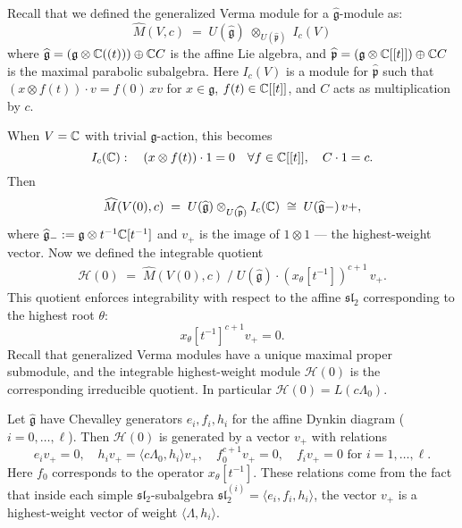 \documentclass[12pt]{article}
\begin{document}
\begin{remark}
     Recall that we defined the generalized Verma module for a $\widehat{\mathfrak g}$-module as:
    \[
        \widehat M(V,c)
        \;=\;
        U(\widehat{\mathfrak g})
        \;\otimes_{U(\widehat{\mathfrak p})}\;
        I_c(V)
    \] where $\widehat{\mathfrak g} = (\mathfrak g\otimes\mathbb{C}((t)))\oplus\mathbb{C} C$ is the affine Lie algebra, and $\widehat{\mathfrak p} = (\mathfrak g\otimes \mathbb{C}[[t]])\oplus \mathbb{C} C$ is the maximal parabolic subalgebra. Here $I_c(V)$ is a module for $\widehat{\mathfrak p}$ such that $(x\otimes f(t))\cdot v = f(0)\,xv$ for $x\in\mathfrak g$, $f(t)\in\mathbb{C}[[t]]$, and $C$ acts as multiplication by $c$.

    When \(V=\mathbb{C}\) with trivial $\mathfrak g$-action, this becomes
    \[
        I_c(\mathbb{C}):\quad
        (x\otimes f(t))\cdot 1 = 0 \quad \forall f\in\mathbb{C}[[t]],
        \quad
        C\cdot 1 = c.
    \]
    Then
    \[
        \widehat M(V(0),c)
        \;=\;
        U(\widehat{\mathfrak g})
        \otimes_{U(\widehat{\mathfrak p})}
        I_c(\mathbb{C})
        \;\cong\;
        U(\widehat{\mathfrak g}-)\,v+,
    \]
    where
    \(\widehat{\mathfrak g}_- := \mathfrak g\otimes t^{-1}\mathbb{C}[t^{-1}]\)
    and $v_+$ is the image of $1\otimes 1$ — the highest-weight vector. Now we defined the integrable quotient
    \begin{align*}
        \mathcal H(0)
        \;=\;
        \widehat M(V(0),c)
        \;\Big/\;
        U(\widehat{\mathfrak g})
        \cdot
        (x_\theta[t^{-1}])^{c+1}\,v_+.
    \end{align*}
    This quotient enforces integrability with respect to the affine $\widehat{\mathfrak{sl}}_2$ corresponding to the highest root $\theta$:
    \[
        x_\theta[t^{-1}]^{c+1}v_+ = 0.
    \]
    Recall that generalized Verma modules have a unique maximal proper submodule, and the integrable highest-weight module $\mathcal{H}(0)$ is the corresponding irreducible quotient. In particular $\mathcal{H}(0)=L(c\Lambda_0)$.

    Let $\widehat{\mathfrak g}$ have Chevalley generators $e_i,f_i,h_i$ for the affine Dynkin diagram ($i=0,\dots,\ell$). Then $\mathcal{H}(0)$ is generated by a vector $v_+$ with relations
    \[
        e_i v_+=0, \quad h_i v_+=\langle c\Lambda_0,h_i\rangle v_+, \quad
        f_0^{c+1}v_+=0, \quad f_i v_+=0 \text{ for } i=1,\dots,\ell.
    \]
    Here $f_0$ corresponds to the operator $x_\theta[t^{-1}]$. These relations come from the fact that inside each simple $\mathfrak{sl}_2$-subalgebra $\mathfrak{sl}_2^{(i)} = \langle e_i, f_i, h_i \rangle$, the vector $v_+$ is a highest-weight vector of weight $\langle \Lambda, h_i\rangle$.


\end{remark}
\end{document}
